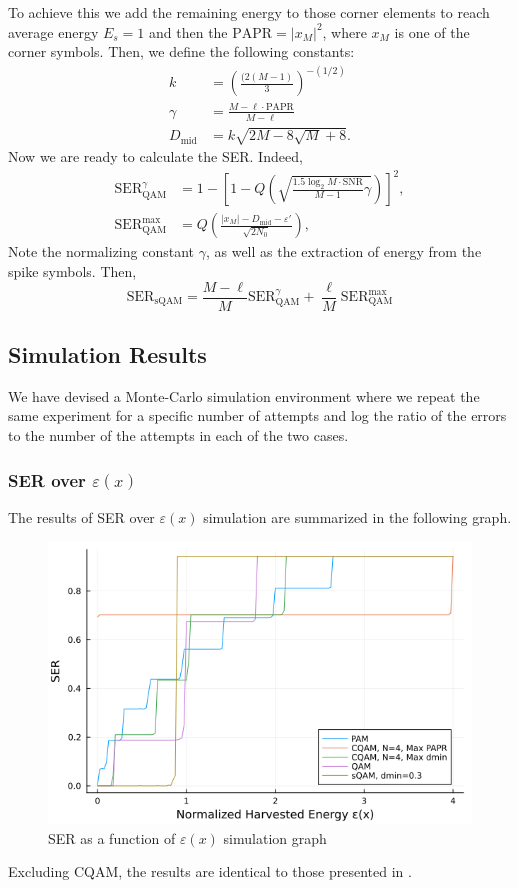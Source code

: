 \documentclass[11pt,a4paper,onecolumn,final]{article}
\newcommand{\eps}{\varepsilon}
\begin{document}
To achieve this we add the remaining energy to those corner elements to reach average energy \(E_s = 1\) and then the \(\text{PAPR} = |x_M|^2\), where \(x_M\) is one of the corner symbols. Then, we define the following constants: 
\begin{align}
    k &= \left(\frac{(2(M - 1)}{3}\right)^{-(1/2)} \\
    \gamma &= \frac{M - \ell \cdot \text{PAPR}}{M - \ell} \\
    D_\text{mid} &= k\sqrt{2M - 8\sqrt{M} + 8}. 
\end{align}
Now we are ready to calculate the SER. Indeed, 
\begin{align}
    \text{SER}_\text{QAM}^\gamma &= 1 - \left[1 - Q\left(\sqrt{\frac{1.5\log_2 M \cdot \text{SNR}}{M - 1}\gamma}\right)\right]^2, \\
    \text{SER}_\text{QAM}^\text{max} &= Q\left(\frac{|x_M| - D_\text{mid} - \eps '}{\sqrt{2N_0}}\right),
\end{align}
Note the normalizing constant \(\gamma \), as well as the extraction of energy from the spike symbols. Then, 
\begin{equation}
    \text{SER}_\text{sQAM} = \frac{M - \ell}{M }\text{SER}_\text{QAM}^\gamma + \frac{\ell }{M }\text{SER}_\text{QAM}^\text{max}
\end{equation}

\subsection{Simulation Results}
We have devised a Monte-Carlo simulation environment where we repeat the same experiment for a specific number of attempts and log the ratio of the errors to the number of the attempts in each of the two cases. 

\subsubsection*{SER over \(\eps(x)\)}
The results of SER over \(\eps(x)\) simulation are summarized in the following graph. 

\begin{figure}[h]
    \centering
    \includegraphics[scale=0.59]{ex2_a.png}
    \caption{SER as a function of \(\eps(x)\) simulation graph}
\end{figure}
Excluding CQAM, the results are identical to those presented in \cite{cqam}. 
\end{document}
